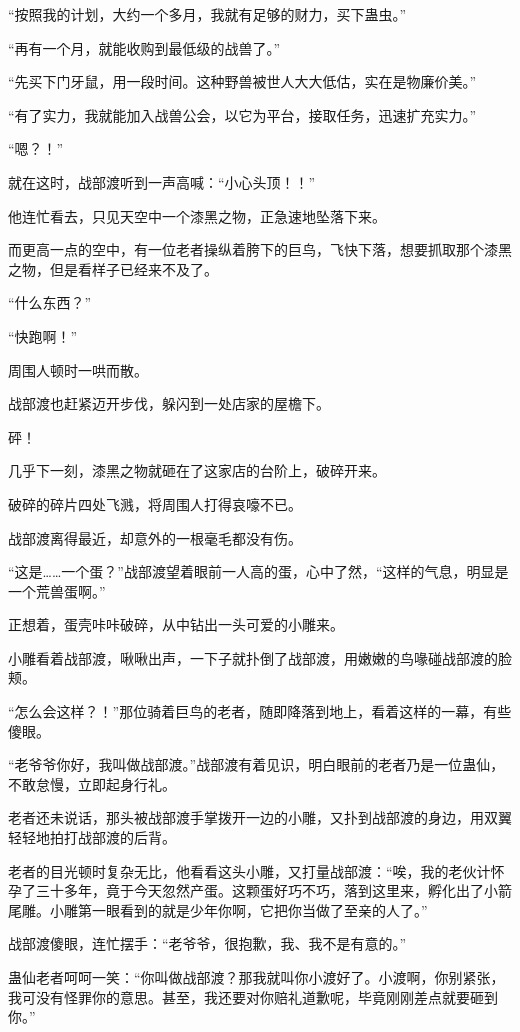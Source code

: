 \begin{this_body}
“按照我的计划，大约一个多月，我就有足够的财力，买下蛊虫。”

“再有一个月，就能收购到最低级的战兽了。”

“先买下门牙鼠，用一段时间。这种野兽被世人大大低估，实在是物廉价美。”

“有了实力，我就能加入战兽公会，以它为平台，接取任务，迅速扩充实力。”

“嗯？！”

就在这时，战部渡听到一声高喊：“小心头顶！！”

他连忙看去，只见天空中一个漆黑之物，正急速地坠落下来。

而更高一点的空中，有一位老者操纵着胯下的巨鸟，飞快下落，想要抓取那个漆黑之物，但是看样子已经来不及了。

“什么东西？”

“快跑啊！”

周围人顿时一哄而散。

战部渡也赶紧迈开步伐，躲闪到一处店家的屋檐下。

砰！

几乎下一刻，漆黑之物就砸在了这家店的台阶上，破碎开来。

破碎的碎片四处飞溅，将周围人打得哀嚎不已。

战部渡离得最近，却意外的一根毫毛都没有伤。

“这是……一个蛋？”战部渡望着眼前一人高的蛋，心中了然，“这样的气息，明显是一个荒兽蛋啊。”

正想着，蛋壳咔咔破碎，从中钻出一头可爱的小雕来。

小雕看着战部渡，啾啾出声，一下子就扑倒了战部渡，用嫩嫩的鸟喙碰战部渡的脸颊。

“怎么会这样？！”那位骑着巨鸟的老者，随即降落到地上，看着这样的一幕，有些傻眼。

“老爷爷你好，我叫做战部渡。”战部渡有着见识，明白眼前的老者乃是一位蛊仙，不敢怠慢，立即起身行礼。

老者还未说话，那头被战部渡手掌拨开一边的小雕，又扑到战部渡的身边，用双翼轻轻地拍打战部渡的后背。

老者的目光顿时复杂无比，他看看这头小雕，又打量战部渡：“唉，我的老伙计怀孕了三十多年，竟于今天忽然产蛋。这颗蛋好巧不巧，落到这里来，孵化出了小箭尾雕。小雕第一眼看到的就是少年你啊，它把你当做了至亲的人了。”

战部渡傻眼，连忙摆手：“老爷爷，很抱歉，我、我不是有意的。”

蛊仙老者呵呵一笑：“你叫做战部渡？那我就叫你小渡好了。小渡啊，你别紧张，我可没有怪罪你的意思。甚至，我还要对你赔礼道歉呢，毕竟刚刚差点就要砸到你。”


\end{this_body}

